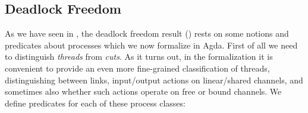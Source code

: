 \subsection{Deadlock Freedom}
\label{sec:deadlock-freedom-agda}

As we have seen in , the deadlock freedom result
() rests on some notions and predicates about processes which we
now formalize in Agda. First of all we need to distinguish \emph{threads} from
\emph{cuts}. As it turns out, in the formalization it is convenient to provide
an even more fine-grained classification of threads, distinguishing between
links, input/output actions on linear/shared channels, and sometimes also
whether such actions operate on free or bound channels. We define predicates for
each of these process classes:

